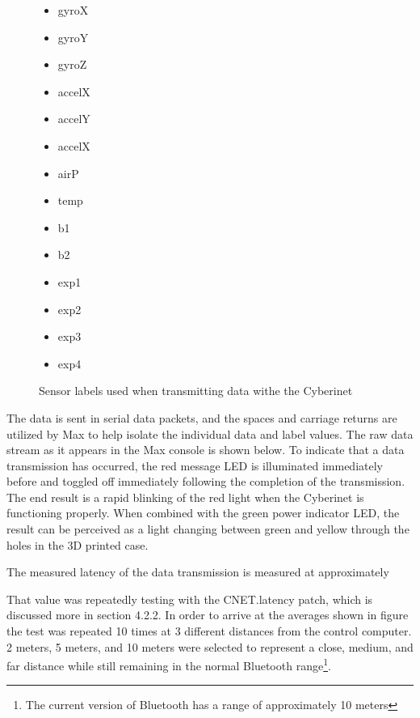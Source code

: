 \begin{figure}
    \centering
    \begin{itemize}
    \item gyroX
    \item gyroY
    \item gyroZ
    \item accelX
    \item accelY
    \item accelX
    \item airP
    \item temp
    \item b1
    \item b2
    \item exp1
    \item exp2
    \item exp3
    \item exp4
\end{itemize}
    \caption{Sensor labels used when transmitting data withe the Cyberinet}
    \label{fig:sensorLAbels}
\end{figure}

The data is sent in serial data packets, and the spaces and carriage returns are utilized by Max to help isolate the individual data and label values. The raw data stream as it appears in the Max console is shown below. To indicate that a data transmission has occurred, the red message LED is illuminated immediately before and toggled off immediately following the completion of the transmission. The end result is a rapid blinking of the red light when the Cyberinet is functioning properly. When combined with the green power indicator LED, the result can be perceived as a light changing between green and yellow through the holes in the 3D printed case.


The measured latency of the data transmission is measured at approximately %

That value was repeatedly testing with the CNET.latency patch, which is discussed more in section 4.2.2. In order to arrive at the averages shown in figure %
the test was repeated 10 times at 3 different distances from the control computer. 2 meters, 5 meters, and 10 meters were selected to represent a close, medium, and far distance while still remaining in the normal Bluetooth range\footnote{The current version of Bluetooth has a range of approximately 10 meters}.

